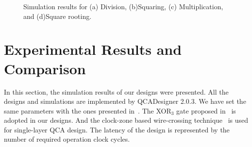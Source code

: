 \documentclass[9pt,journal,compsoc]{IEEEtran}
\begin{document}
\begin{figure}[h]
    \centering \scriptsize
    \hfil
    \hfil
    \hfil
    \vspace{-2ex}
    \caption{Simulation results for (a) Division, (b)Squaring, (c) Multiplication, and (d)Square rooting.}\label{tt_array} \vspace{-3ex}
\end{figure}

\vspace{-1ex}
\section{Experimental Results and Comparison}\vspace{-1ex}
In this section, the simulation results of our designs were presented.
All the designs and simulations are implemented by QCADesigner 2.0.3.
We have set the same parameters with the ones presented in~\cite{2}.
The XOR$_3$ gate proposed in~\cite{3} is adopted in our designs.
And the clock-zone based wire-crossing technique~\cite{shin2013wire} is used for single-layer QCA design.
The latency of the design is represented by the number of required operation clock cycles.
\end{document}
